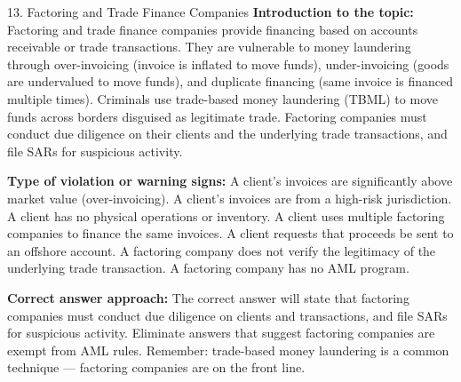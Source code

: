 \documentclass[11pt,a4paper]{beamer}
\begin{document}
\begin{frame}{13. Factoring and Trade Finance Companies}
\tiny
\noindent\textbf{Introduction to the topic:} Factoring and trade finance companies provide financing based on accounts receivable or trade transactions. They are vulnerable to money laundering through over-invoicing (invoice is inflated to move funds), under-invoicing (goods are undervalued to move funds), and duplicate financing (same invoice is financed multiple times). Criminals use trade-based money laundering (TBML) to move funds across borders disguised as legitimate trade. Factoring companies must conduct due diligence on their clients and the underlying trade transactions, and file SARs for suspicious activity.

\vspace{0.1cm}
\noindent\textbf{Type of violation or warning signs:} A client's invoices are significantly above market value (over-invoicing). A client's invoices are from a high-risk jurisdiction. A client has no physical operations or inventory. A client uses multiple factoring companies to finance the same invoices. A client requests that proceeds be sent to an offshore account. A factoring company does not verify the legitimacy of the underlying trade transaction. A factoring company has no AML program.

\vspace{0.1cm}
\noindent\textbf{Correct answer approach:} The correct answer will state that factoring companies must conduct due diligence on clients and transactions, and file SARs for suspicious activity. Eliminate answers that suggest factoring companies are exempt from AML rules. Remember: trade-based money laundering is a common technique — factoring companies are on the front line.
\end{frame}
\end{document}
